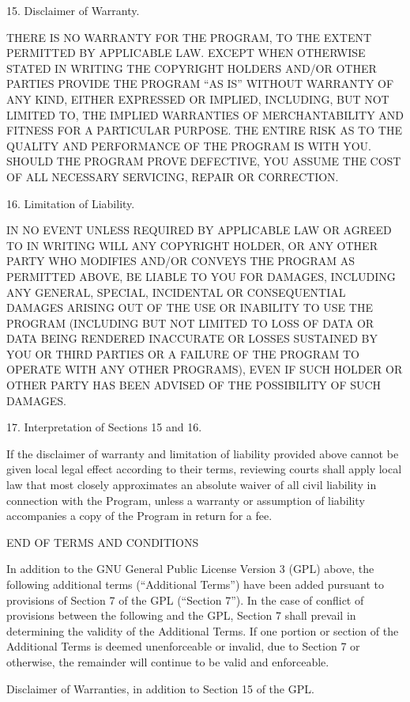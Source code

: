 \documentclass[letterpaper,12pt]{article}
\begin{document}
{15. Disclaimer of Warranty.

THERE IS NO WARRANTY FOR THE PROGRAM, TO THE EXTENT PERMITTED BY APPLICABLE LAW. EXCEPT WHEN OTHERWISE STATED IN WRITING THE COPYRIGHT HOLDERS AND/OR OTHER PARTIES PROVIDE THE PROGRAM ``AS IS'' WITHOUT WARRANTY OF ANY KIND, EITHER EXPRESSED OR IMPLIED, INCLUDING, BUT NOT LIMITED TO, THE IMPLIED WARRANTIES OF MERCHANTABILITY AND FITNESS FOR A PARTICULAR PURPOSE. THE ENTIRE RISK AS TO THE QUALITY AND PERFORMANCE OF THE PROGRAM IS WITH YOU. SHOULD THE PROGRAM PROVE DEFECTIVE, YOU ASSUME THE COST OF ALL NECESSARY SERVICING, REPAIR OR CORRECTION.

16. Limitation of Liability.

IN NO EVENT UNLESS REQUIRED BY APPLICABLE LAW OR AGREED TO IN WRITING WILL ANY COPYRIGHT HOLDER, OR ANY OTHER PARTY WHO MODIFIES AND/OR CONVEYS THE PROGRAM AS PERMITTED ABOVE, BE LIABLE TO YOU FOR DAMAGES, INCLUDING ANY GENERAL, SPECIAL, INCIDENTAL OR CONSEQUENTIAL DAMAGES ARISING OUT OF THE USE OR INABILITY TO USE THE PROGRAM (INCLUDING BUT NOT LIMITED TO LOSS OF DATA OR DATA BEING RENDERED INACCURATE OR LOSSES SUSTAINED BY YOU OR THIRD PARTIES OR A FAILURE OF THE PROGRAM TO OPERATE WITH ANY OTHER PROGRAMS), EVEN IF SUCH HOLDER OR OTHER PARTY HAS BEEN ADVISED OF THE POSSIBILITY OF SUCH DAMAGES.

17. Interpretation of Sections 15 and 16.

If the disclaimer of warranty and limitation of liability provided above cannot be given local legal effect according to their terms, reviewing courts shall apply local law that most closely approximates an absolute waiver of all civil liability in connection with the Program, unless a warranty or assumption of liability accompanies a copy of the Program in return for a fee.

END OF TERMS AND CONDITIONS


\hrulefill

In addition to the GNU General Public License Version 3 (GPL) above, the following additional terms (``Additional Terms'') have been added pursuant to provisions of Section 7 of the GPL (``Section 7''). In the case of conflict of provisions between the following and the GPL, Section 7 shall prevail in determining the validity of the Additional Terms. If one portion or section of the Additional Terms is deemed unenforceable or invalid, due to Section 7 or otherwise, the remainder will continue to be valid and enforceable.


Disclaimer of Warranties, in addition to Section 15 of the GPL. 

}
\end{document}
